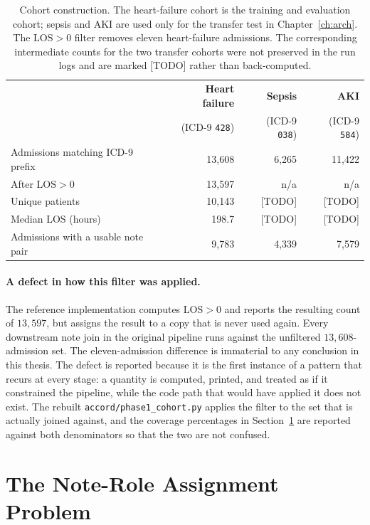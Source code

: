 \begin{table}[t]
\centering
\small
\begin{tabular}{lrrr}
\toprule
 & \textbf{Heart failure} & \textbf{Sepsis} & \textbf{AKI} \\
 & (ICD-9 \texttt{428}) & (ICD-9 \texttt{038}) & (ICD-9 \texttt{584}) \\
\midrule
Admissions matching ICD-9 prefix & 13,608 & 6,265 & 11,422 \\
After $\mathrm{LOS} > 0$         & 13,597 & n/a   & n/a    \\
Unique patients                   & 10,143 & [TODO] & [TODO] \\
Median LOS (hours)                & 198.7  & [TODO] & [TODO] \\
\midrule
Admissions with a usable note pair & 9,783 & 4,339 & 7,579 \\
\bottomrule
\end{tabular}
\caption{Cohort construction. The heart-failure cohort is the training and
evaluation cohort; sepsis and AKI are used only for the transfer test in
Chapter~\ref{ch:arch}. The $\mathrm{LOS} > 0$ filter removes eleven
heart-failure admissions. The corresponding intermediate counts for the two
transfer cohorts were not preserved in the run logs and are marked [TODO]
rather than back-computed.}
\label{tab:cohort}
\end{table}

\paragraph{A defect in how this filter was applied.}
The reference implementation computes $\mathrm{LOS} > 0$ and reports the
resulting count of $13{,}597$, but assigns the result to a copy that is never
used again. Every downstream note join in the original pipeline runs against the
unfiltered $13{,}608$-admission set. The eleven-admission difference is
immaterial to any conclusion in this thesis. The defect is reported because it
is the first instance of a pattern that recurs at every stage: a quantity is
computed, printed, and treated as if it constrained the pipeline, while the code
path that would have applied it does not exist. The rebuilt
\texttt{accord/phase1\_cohort.py} applies the filter to the set that is actually
joined against, and the coverage percentages in
Section~\ref{sec:role-assignment} are reported against both denominators so that
the two are not confused.

\section{The Note-Role Assignment Problem}
\label{sec:role-assignment}

